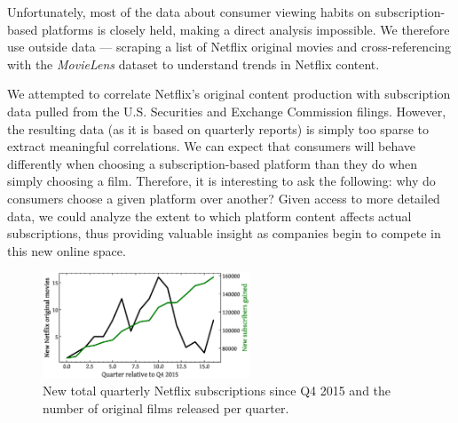 \documentclass[dvipsnames]{article}
\begin{document}
Unfortunately, most of the data about consumer viewing habits on subscription-based platforms is closely held, making a direct analysis impossible. We therefore use outside data --- scraping a list of Netflix original movies and cross-referencing with the \textit{MovieLens} dataset to understand trends in Netflix content.

We attempted to correlate Netflix's original content production with subscription data pulled from the U.S. Securities and Exchange Commission filings. However, the resulting data (as it is based on quarterly reports) is simply too sparse to extract meaningful correlations. We can expect that consumers will behave differently when choosing a subscription-based platform than they do when simply choosing a film. Therefore, it is interesting to ask the following: why do consumers choose a given platform over another? Given access to more detailed data, we could analyze the extent to which platform content affects actual subscriptions, thus providing valuable insight as companies begin to compete in this new online space.  

\begin{figure}
    \centering
    \includegraphics[width=0.55\textwidth]{nsvo.eps}
    \caption{New total quarterly Netflix subscriptions since Q4 2015 and the number of original films released per quarter.}
    \label{fig:nsvo}
\end{figure}
\end{document}
